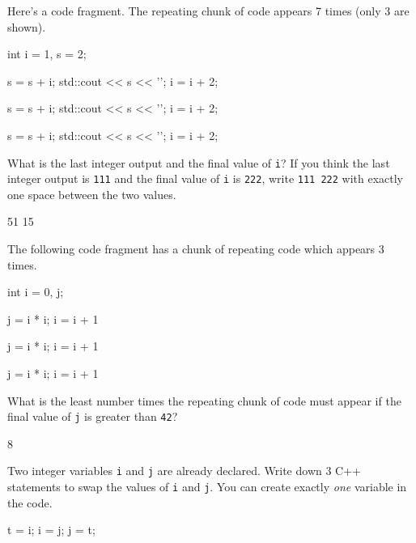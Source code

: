 \nextq
Here's a code fragment.
The repeating chunk of code appears 7 times (only 3 are shown).
\begin{console}[commandchars=\@\{\},fontsize=\small]
int i = 1, s = 2;

s = s + i;
std::cout << s << '\n';
i = i + 2;

s = s + i;
std::cout << s << '\n';
i = i + 2;

s = s + i;
std::cout << s << '\n';
i = i + 2;
\end{console}
What is the last integer output and the final value of \verb!i!?
If you think the last integer output is \verb!111! and the final
value of \verb!i! is \verb!222!,
write \verb!111 222! with exactly one space between the two values.
\\
\ANSWER
\begin{answercode}
51 15
\end{answercode}

\nextq
The following code fragment has a chunk of repeating code
which appears 3 times.
\begin{console}[commandchars=\@\{\},fontsize=\small]
int i = 0, j;

j = i * i;
i = i + 1

j = i * i;
i = i + 1

j = i * i;
i = i + 1
\end{console}
What is the least number times the repeating chunk of code must appear if
the final value of \verb!j! is greater than \verb!42!?
\\
\ANSWER
\begin{answercode}
8
\end{answercode}

\nextq
Two integer variables \verb$i$ and \verb$j$ are already declared.
Write down 3 C++ statements to swap the values of
\verb$i$ and \verb$j$.
You can create exactly \textit{one} variable in the code.
\\
\ANSWER
\begin{answercode}
t = i;
i = j;
j = t;
\end{answercode}


